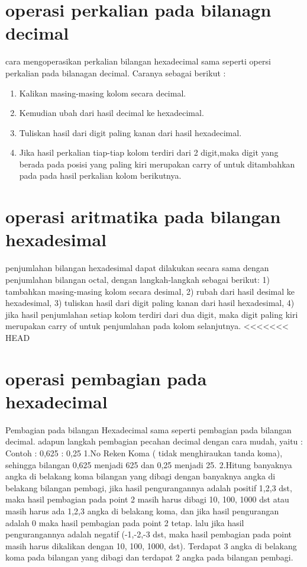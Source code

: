 \section{operasi perkalian pada bilanagn decimal}
cara mengoperasikan perkalian bilangan hexadecimal sama seperti opersi perkalian pada bilanagan decimal. Caranya sebagai berikut :
\begin{enumerate}	
\item Kalikan masing-masing kolom secara decimal.
\item Kemudian ubah dari hasil decimal ke hexadecimal.
\item Tuliskan hasil dari digit paling kanan dari hasil hexadecimal.
\item Jika hasil perkalian tiap-tiap kolom terdiri dari 2 digit,maka digit yang berada pada posisi yang paling kiri merupakan carry of untuk ditambahkan pada pada hasil perkalian kolom berikutnya.
\end{enumerate}

\section{operasi aritmatika pada bilangan hexadesimal}
penjumlahan bilangan hexadesimal dapat dilakukan secara sama dengan penjumlahan bilangan octal, dengan langkah-langkah sebagai berikut: 1) tambahkan masing-masing kolom secara desimal, 2) rubah dari hasil desimal ke hexadesimal, 3) tuliskan hasil dari digit paling kanan dari hasil hexadesimal, 4) jika hasil penjumlahan setiap kolom terdiri dari dua digit, maka digit paling kiri merupakan carry of untuk penjumlahan pada kolom selanjutnya.
<<<<<<< HEAD
\section {operasi pembagian pada hexadecimal}
Pembagian pada bilangan Hexadecimal sama seperti pembagian pada bilangan decimal. adapun langkah pembagian pecahan decimal dengan cara mudah, yaitu :
	Contoh : 0,625 : 0,25
	1.No Reken Koma ( tidak menghiraukan tanda koma), sehingga bilangan 0,625 menjadi 625 dan 0,25 menjadi 25.
	2.Hitung banyaknya angka di belakang koma bilangan yang dibagi dengan banyaknya angka di belakang bilangan pembagi, jika hasil pengurangannya adalah positif 1,2,3 dst, maka hasil pembagian pada point 2 masih harus dibagi 10, 100, 1000 dst atau masih harus ada 1,2,3 angka di belakang koma, dan jika hasil pengurangan adalah 0 maka hasil pembagian pada point 2 tetap. lalu jika hasil pengurangannya adalah negatif (-1,-2,-3 dst, maka hasil pembagian pada point masih harus dikalikan dengan 10, 100, 1000, dst). Terdapat 3 angka di belakang koma pada bilangan yang dibagi dan terdapat 2 angka pada bilangan pembagi. 

